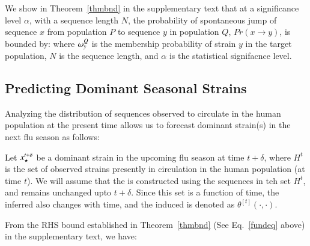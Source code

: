 {We show in Theorem~\ref{thmbnd} in the supplementary text that at a significance level $\alpha$, with a sequence length $N$, the probability of spontaneous jump of sequence $x$ from population $P$ to sequence $y$ in population $Q$, $Pr(x \rightarrow y)$, is bounded by:
where $\omega_{y}^Q$ is the membership probability of strain $y$ in the target population, $N$ is the sequence length, and $\alpha$ is the statistical signifacnce level.


\subsection*{Predicting Dominant Seasonal Strains} 

Analyzing the distribution of sequences observed to circulate in the human population at the present time allows us to forecast dominant strain(s) in the next flu season as follows:

Let $x_\star^{t+\delta}$ be a dominant strain in the upcoming flu season at time $t+\delta$,
where $H^t$ is the set of observed strains presently in circulation in the human population (at time $t$). We will assume that the \enet is constructed using the sequences in teh set $H^t$, and remains unchanged upto $t+\delta$. Since this set is a function of time, the inferred \enet also changes with time, and the induced \qdist is denoted as $\theta^{[t]}(\cdot,\cdot)$.

From the RHS bound established in Theorem~\ref{thmbnd} (See Eq.~\eqref{fundeq} above) in the supplementary text, we have:
%
%
%
}
